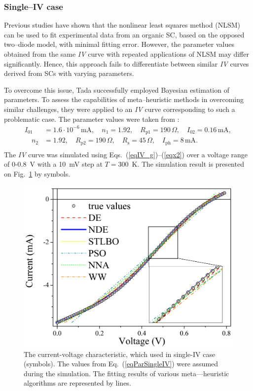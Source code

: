 \documentclass[a4paper,fleqn]{cas-sc}
\begin{document}
\subsubsection{Single--IV case}\label{SingleIV}

Previous studies \cite{Tada2015Organic,Tada2021} have shown that the nonlinear least squares method (NLSM) can be used to fit experimental data from an organic SC, 
based on the opposed two--diode model, with minimal fitting error.
However, the parameter values obtained from the same \emph{IV} curve with repeated applications of NLSM may differ significantly.
Hence, this approach fails to differentiate between similar \emph{IV} curves derived from SCs with varying parameters.

To overcome this issue, Tada \cite{Tada2021} successfully employed Bayesian estimation of parameters.
To assess the capabilities of meta--heuristic methods in overcoming similar challenges, 
they were applied to an \emph{IV} curve corresponding to such a problematic case.
The parameter values were taken from \cite{Tada2021}:
\begin{equation}
\label{eqParSingleIV}
\begin{split}
I_{01}&=1.6\cdot10^{-6}\,\text{mA},\quad n_1=1.92,\quad R_\mathrm{p1}=190\,\Omega,\quad I_{02}=0.16\,\text{mA},\\
\quad n_2&=1.92, \quad R_\mathrm{p2}=190\,\Omega,\quad R_\mathrm{s}=45\,\Omega,\quad I_\mathrm{ph}=8\,\text{mA}.\\
\end{split}
\end{equation}
The \emph{IV} curve was simulated using Eqs.~(\ref{eqIV_g})--(\ref{eqx2}) over a voltage range of 0-0.8~V with a 10~mV step at $T=300$~K.
The simulation result is presented on Fig.~\ref{figSigleIV} by symbols.

\begin{figure}[]
	\centering
		\includegraphics[width=0.5\columnwidth]{Fig2}
	  \caption{The current-voltage characteristic, which used in single-IV case (symbols). 
        The values from Eq.~(\ref{eqParSingleIV}) were assumed during the simulation. 
        The fitting results of various meta---heuristic algorithms are represented by lines.}\label{figSigleIV}
\end{figure}
\end{document}
